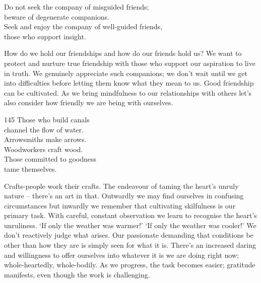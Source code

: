 
\begin{dhpVerse}{78}
\label{dhp-78}
Do not seek the company of misguided friends;\\
beware of degenerate companions.\\
Seek and enjoy the company of well-guided friends,\\
those who support insight.
\end{dhpVerse}

\begin{dhpRefl}

How do we hold our friendships and how do our friends hold us? We
want to protect and nurture true friendship with those who support
our aspiration to live in truth. We genuinely appreciate such
companions; we don't wait until we get into difficulties before
letting them know what they mean to us. Good friendship can be
cultivated. As we bring mindfulness to our relationships with others
let's also consider how friendly we are being with ourselves.

\end{dhpRefl}


\begin{dhpVerse}{145}
\label{dhp-145}
Those who build canals\\
channel the flow of water.\\
Arrowsmiths make arrows.\\
Woodworkers craft wood.\\
Those committed to goodness\\
tame themselves.
\end{dhpVerse}

\begin{dhpRefl}

Crafts-people work their crafts. The endeavour of taming the heart's
unruly nature -- there's an art in that. Outwardly we may find
ourselves in confusing circumstances but inwardly we remember that
cultivating skilfulness is our primary task. With careful, constant
observation we learn to recognise the heart's unruliness. `If only
the weather was warmer!' `If only the weather was cooler!' We don't
reactively judge what arises. Our passionate demanding that
conditions be other than how they are is simply seen for what it is.
There's an increased daring and willingness to offer ourselves into
whatever it is we are doing right now; whole-heartedly, whole-bodily.
As we progress, the task becomes easier; gratitude manifests, even
though the work is challenging.

\end{dhpRefl}

